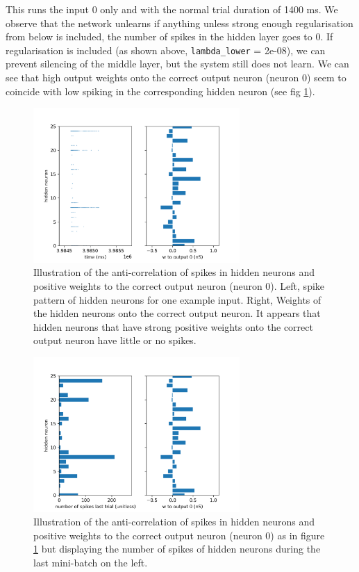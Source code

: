 \documentclass[a4paper]{article}
\begin{document}
  This runs the input 0 only and with the normal trial duration of 1400 ms. We observe that the network unlearns if anything unless strong enough regularisation from below is included, the number of spikes in the hidden layer goes to 0. If regularisation is included (as shown above, \verb+lambda_lower+ = 2e-08), we can prevent silencing of the middle layer, but the system still does not learn. We can see that high output weights onto the correct output neuron (neuron 0) seem to coincide with low spiking in the corresponding hidden neuron (see fig \ref{fig_axe1}).

  \begin{figure}
    \includegraphics[width=0.7\textwidth]{test_axe1_spikes_weights.png}
    \caption{Illustration of the anti-correlation of spikes in hidden neurons and positive weights to the correct output neuron (neuron 0). Left, spike pattern of hidden neurons for one example input. Right, Weights of the hidden neurons onto the correct output neuron. It appears that hidden neurons that have strong positive weights onto the correct output neuron have little or no spikes. \label{fig_axe1}}
  \end{figure}

  \begin{figure}
    \includegraphics[width=0.7\textwidth]{test_axe1_rates_weights.png}
    \caption{Illustration of the anti-correlation of spikes in hidden neurons and positive weights to the correct output neuron (neuron 0) as in figure \ref{fig_axe1} but displaying the number of spikes of hidden neurons during the last mini-batch on the left. \label{fig_axe2}}
  \end{figure}
\end{document}
